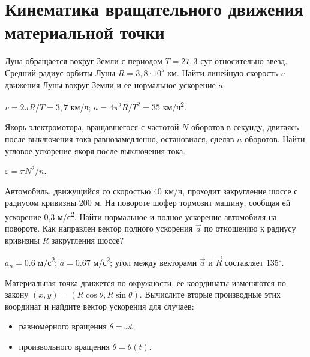 \section{Кинематика вращательного движения материальной точки}

\introProblems

\begin{ex} %
Луна обращается вокруг Земли с периодом $T = 27,3$ сут относительно звезд. Средний радиус орбиты Луны $R = 3,8 \cdot 10^5$ км. Найти линейную скорость $v$ движения Луны вокруг Земли и ее нормальное ускорение $a$. 
\begin{ans}
$v = 2 \pi R/T = 3,7$ км/ч; $a = 4\pi^2 R/T^2 = 35$ км/ч\textsuperscript{2}.
\end{ans}
\end{ex}

\begin{ex} %
Якорь электромотора, вращавшегося с частотой $N$ оборотов в секунду, двигаясь после выключения тока равнозамедленно, остановился, сделав $n$ оборотов. Найти угловое ускорение якоря после выключения тока.
\begin{ans}
$\varepsilon = \pi N^2/n$.
\end{ans}
\end{ex}

\begin{ex} %
Автомобиль, движущийся со скоростью 40 км/ч, проходит закругление шоссе с радиусом кривизны 200 м. На повороте шофер тормозит машину, сообщая ей ускорение 0,3 м/с\textsuperscript{2}. Найти нормальное и полное ускорение автомобиля на повороте. Как направлен вектор полного ускорения $\vec{a}$ по отношению к радиусу кривизны $R$ закругления шоссе?
\begin{ans}
$a_n = 0.6$ м/с\textsuperscript{2}; $a = 0.67$ м/с\textsuperscript{2}; угол между векторами $\vec{a}$ и $\vec{R}$ составляет $135^{\circ}$.
\end{ans}
\end{ex}

\begin{ex}
Материальная точка движется по окружности, ее координаты изменяются по закону $(x, y) = (R \cos \theta, R \sin \theta)$. Вычислите вторые производные этих координат и найдите вектор ускорения для случаев:
\begin{itemize}
\item равномерного вращения $\theta = \omega t$;
\item произвольного вращения $\theta = \theta(t)$.
\end{itemize}
\end{ex}

